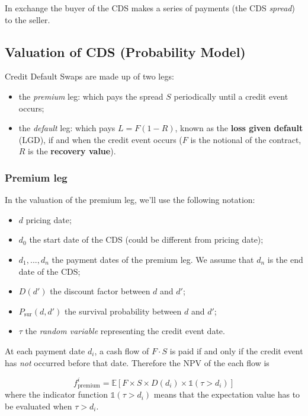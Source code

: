 In exchange the buyer of the CDS makes a series of payments (the CDS \emph{spread}) to the seller.

\subsection{Valuation of CDS (Probability Model)}
\label{sec:cds_valuation}

Credit Default Swaps are made up of two legs:

\begin{itemize}
\tightlist
\item
  the \emph{premium} leg: which pays the spread \(S\) periodically until a credit event occurs;
\item
  the \emph{default} leg: which pays \(L = F(1 - R)\), known as the
  \textbf{loss given default} (LGD), if and when the credit event occurs ($F$ is the notional of the contract, $R$ is the \textbf{recovery value}).
\end{itemize}

\subsubsection{Premium leg}\label{premium-leg}

In the valuation of the premium leg, we'll use the following notation:

\begin{itemize}
\tightlist
\item
  \(d\) pricing date;
\item
  \(d_0\) the start date of the CDS (could be different from pricing date);
\item
  \(d_1, ..., d_n\) the payment dates of the premium leg. We assume that \(d_n\) is the end date of the CDS;
\item
  \(D(d')\) the discount factor between \(d\) and \(d'\);
\item
  $P_{\textrm{sur}}(d, d')$ the survival probability between \(d\) and \(d'\);
\item
  \(\tau\) the \emph{random variable} representing the credit event date.
\end{itemize}

At each payment date \(d_i\), a cash flow of \(F\cdot S\) is paid if and only if the credit event has \emph{not} occurred before that date. Therefore the NPV of the each flow is

\begin{equation}
f_{\textrm{premium}}^i = \mathbb{E}\left[F\times S \times D(d_i) \times \mathbb{1}(\tau > d_i) \right]
\end{equation}
where the indicator function \(\mathbb{1}(\tau > d_i)\) means that the expectation value has to be evaluated when \(\tau > d_i\). 

